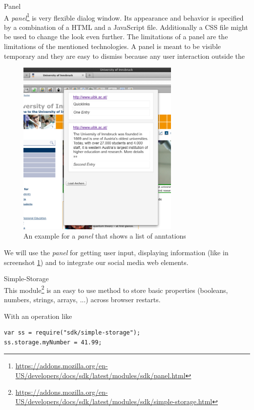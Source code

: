 \begin{description}
\item Panel\\
A \emph{panel}\footnote{\url{https://addons.mozilla.org/en-US/developers/docs/sdk/latest/modules/sdk/panel.html}} is very flexible dialog window. Its appearance and behavior is specified by a combination of a HTML and a JavaScript file. Additionally a CSS file might be used to change the look even further. The limitations of a panel are the limitations of the mentioned technologies. 
A panel is meant to be visible temporary and they are easy to dismiss because any user interaction outside the 

\begin{figure}\centering
		\includegraphics[width=8cm]{images/example-panel.png}
		\caption{An example for a \emph{panel} that shows a list of anntations}
		\label{example-panel}
\end{figure} 

We will use the \emph{panel} for getting user input, displaying information (like in screenshot \ref{example-panel}) and to integrate our social media web elements. 

\item Simple-Storage\\
This module\footnote{\url{https://addons.mozilla.org/en-US/developers/docs/sdk/latest/modules/sdk/simple-storage.html}} is an easy to use method to store basic properties (booleans, numbers, strings, arrays, ...) across browser restarts. 

With an operation like

\begin{lstlisting}
var ss = require("sdk/simple-storage");
ss.storage.myNumber = 41.99;
\end{lstlisting}


\end{description}

